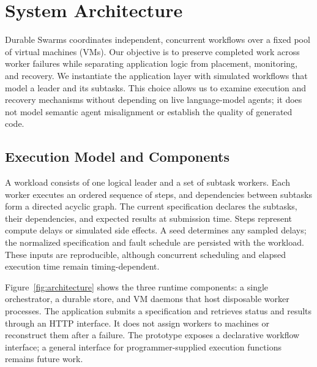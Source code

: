 \section{System Architecture}
\label{sec:architecture}

Durable Swarms coordinates independent, concurrent workflows over a fixed pool
of virtual machines (VMs). Our objective is to preserve completed work across
worker failures while separating application logic from placement, monitoring,
and recovery. We instantiate the application layer with simulated workflows
that model a leader and its subtasks. This choice allows us to examine execution
and recovery mechanisms without depending on live language-model agents; it
does not model semantic agent misalignment or establish the quality of generated
code.

\subsection{Execution Model and Components}
\label{sec:components}

A workload consists of one logical leader and a set of subtask workers. Each
worker executes an ordered sequence of steps, and dependencies between subtasks
form a directed acyclic graph. The current specification declares the subtasks,
their dependencies, and expected results at submission time. Steps represent
compute delays or simulated side effects. A seed determines any sampled delays;
the normalized specification and fault schedule are persisted with the workload.
These inputs are reproducible, although concurrent scheduling and elapsed
execution time remain timing-dependent.

Figure~\ref{fig:architecture} shows the three runtime components: a single
orchestrator, a durable store, and VM daemons that host disposable worker
processes. The application submits a specification and retrieves status and
results through an HTTP interface. It does not assign workers to machines or
reconstruct them after a failure. The prototype exposes a declarative workflow
interface; a general interface for programmer-supplied execution functions
remains future work.

